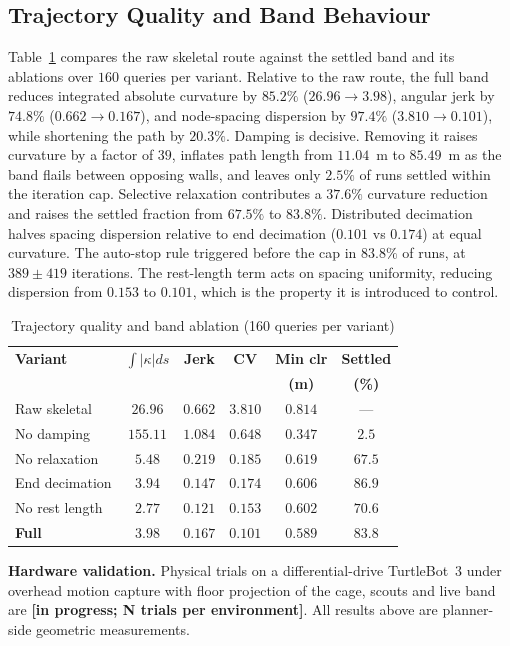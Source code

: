 \documentclass[conference]{IEEEtran}
\newcommand{\PH}[1]{{\color{red}\textbf{[#1]}}}
\begin{document}
\subsection{Trajectory Quality and Band Behaviour}
\label{sec:res-band}
Table~\ref{tab:kinematics} compares the raw skeletal route against the settled band and its ablations over $160$ queries per variant. Relative to the raw route, the full band reduces integrated absolute curvature by $85.2\%$ ($26.96\rightarrow3.98$), angular jerk by $74.8\%$ ($0.662\rightarrow0.167$), and node-spacing dispersion by $97.4\%$ ($3.810\rightarrow0.101$), while shortening the path by $20.3\%$.
Damping is decisive. Removing it raises curvature by a factor of $39$, inflates path length from $11.04$~m to $85.49$~m as the band flails between opposing walls, and leaves only $2.5\%$ of runs settled within the iteration cap. Selective relaxation contributes a $37.6\%$ curvature reduction and raises the settled fraction from $67.5\%$ to $83.8\%$. Distributed decimation halves spacing dispersion relative to end decimation ($0.101$ vs $0.174$) at equal curvature. The auto-stop rule triggered before the cap in $83.8\%$ of runs, at $389\pm419$ iterations.
The rest-length term acts on spacing uniformity, reducing dispersion from $0.153$ to $0.101$, which is the property it is introduced to control.
\begin{table}[htbp]
\caption{Trajectory quality and band ablation (160 queries per variant)}
\label{tab:kinematics}
\begin{center}
\begin{tabular}{@{}lccccc@{}}
\toprule
\textbf{Variant} & $\int|\kappa|ds$ & \textbf{Jerk} & \textbf{CV} & \textbf{Min clr} & \textbf{Settled} \\
 & & & & \textbf{(m)} & \textbf{(\%)} \\ \midrule
Raw skeletal & $26.96$ & $0.662$ & $3.810$ & $0.814$ & --- \\
No damping & $155.11$ & $1.084$ & $0.648$ & $0.347$ & $2.5$ \\
No relaxation & $5.48$ & $0.219$ & $0.185$ & $0.619$ & $67.5$ \\
End decimation & $3.94$ & $0.147$ & $0.174$ & $0.606$ & $\mathbf{86.9}$ \\
No rest length & $\mathbf{2.77}$ & $\mathbf{0.121}$ & $0.153$ & $0.602$ & $70.6$ \\
\textbf{Full} & $3.98$ & $0.167$ & $\mathbf{0.101}$ & $0.589$ & $83.8$ \\ \bottomrule
\end{tabular}
\end{center}
\end{table}
\textbf{Hardware validation.} Physical trials on a differential-drive TurtleBot~3 under overhead motion capture with floor projection of the cage, scouts and live band are \PH{in progress; N trials per environment}. All results above are planner-side geometric measurements.
\end{document}
